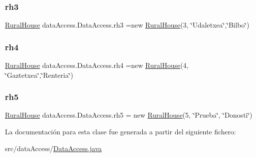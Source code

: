 \subsubsection{\texorpdfstring{rh3}{rh3}}
{\footnotesize\ttfamily \mbox{\hyperlink{classdomain_1_1_rural_house}{Rural\+House}} data\+Access.\+Data\+Access.\+rh3 =new \mbox{\hyperlink{classdomain_1_1_rural_house}{Rural\+House}}(3, \char`\"{}Udaletxea\char`\"{},\char`\"{}Bilbo\char`\"{})\hspace{0.3cm}{\ttfamily [static]}}

\mbox{\label{classdata_access_1_1_data_access_ae610cd3135e02e7e22239ff243c07a1b}} 
\subsubsection{\texorpdfstring{rh4}{rh4}}
{\footnotesize\ttfamily \mbox{\hyperlink{classdomain_1_1_rural_house}{Rural\+House}} data\+Access.\+Data\+Access.\+rh4 =new \mbox{\hyperlink{classdomain_1_1_rural_house}{Rural\+House}}(4, \char`\"{}Gaztetxea\char`\"{},\char`\"{}Renteria\char`\"{})\hspace{0.3cm}{\ttfamily [static]}}

\mbox{\label{classdata_access_1_1_data_access_a0359904deb5a93ce8049a3ce3343c541}} 
\subsubsection{\texorpdfstring{rh5}{rh5}}
{\footnotesize\ttfamily \mbox{\hyperlink{classdomain_1_1_rural_house}{Rural\+House}} data\+Access.\+Data\+Access.\+rh5 = new \mbox{\hyperlink{classdomain_1_1_rural_house}{Rural\+House}}(5, \char`\"{}Prueba\char`\"{}, \char`\"{}Donosti\char`\"{})\hspace{0.3cm}{\ttfamily [static]}}



La documentación para esta clase fue generada a partir del siguiente fichero\+:\begin{DoxyCompactItemize}
\item 
src/data\+Access/\mbox{\hyperlink{_data_access_8java}{Data\+Access.\+java}}\end{DoxyCompactItemize}
